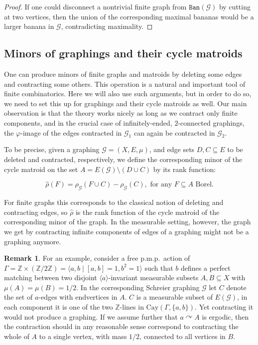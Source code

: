 \documentclass{article}
\theoremstyle{plain}
\theoremstyle{definition}
\newtheorem{rem}[thm]{Remark}
\newcommand{\Cay}{\mathrm{Cay}}
\newcommand{\cG}{\mathcal{G}}
\begin{document}
\begin{proof}
    If one could disconnect a nontrivial finite graph from $\texttt{Ban}(\cG)$ by cutting at two vertices, then the union of the corresponding maximal bananas would be a larger banana in $\cG$, contradicting maximality.
\end{proof}


\subsection{Minors of graphings and their cycle matroids} \label{subsec:minors}

One can produce minors of finite graphs and matroids by deleting some edges and contracting some others. This operation is a natural and important tool of finite combinatorics. Here we will also use such arguments, but in order to do so, we need to set this up for graphings and their cycle matroids as well. Our main observation is that the theory works nicely as long as we contract only finite components, and in the crucial case of infinitely-ended, $2$-connected graphings, the $\varphi$-image of the edges contracted in $\cG_1$ can again be contracted in $\cG_2$.

To be precise, given a graphing $\cG=(X, E, \mu)$, and edge sets $D,C \subseteq E$ to be deleted and contracted, respectively, we define the corresponding minor of the cycle matroid on the set $A=E(\cG) \setminus (D \cup C) $ by its rank function:

\[\hat\rho(F)=\rho_{\cG}(F\cup C)-\rho_{\cG}(C), \textrm{ for any $F \subseteq A$ Borel.}\]

For finite graphs this corresponds to the classical notion of deleting and contracting edges, so $\hat \rho$ is the rank function of the cycle matroid of the corresponding minor of the graph. In the measurable setting, however, the graph we get by contracting infinite components of edges of a graphing might not be a graphing anymore. 

\begin{rem}\label{rem:bad_contraction}
For an example, consider a free p.m.p.\ action of $\Gamma=\mathbb{Z} \times (\mathbb{Z}/2\mathbb{Z}) = \langle a,b\mid [a,b]=1, b^2=1 \rangle$ such that $b$ defines a perfect matching between two disjoint $\langle a \rangle$-invariant measurable subsets $A,B \subseteq X$ with $\mu(A) = \mu(B)=1/2$. In the corresponding Schreier graphing $\cG$ let $C$ denote the set of $a$-edges with endvertices in $A$. $C$ is a measurable subset of $E(\cG)$, in each component it is one of the two $\mathbb{Z}$-lines in $\Cay(\Gamma, \{a,b\})$. Yet contracting it would not produce a graphing. If we assume further that $a \curvearrowright A$ is ergodic, then the contraction should in any reasonable sense correspond to contracting the whole of $A$ to a single vertex, with mass $1/2$, connected to all vertices in $B$.
\end{rem}
\end{document}

